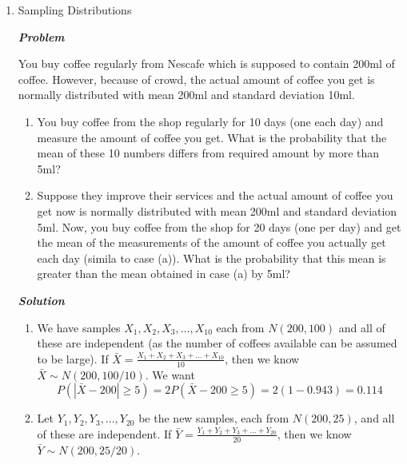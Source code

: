 \documentclass[12pt, oneside]{article}
\begin{document}
\begin{enumerate}
\begin{enumerate}
\end{enumerate}

\newpage

\item	Sampling Distributions

\textit{\textbf{Problem}}

You buy coffee regularly from Nescafe which is supposed to contain 200ml of coffee. However, because of crowd, the actual amount of coffee you get is normally distributed with mean 200ml and standard deviation 10ml. 

\begin{enumerate}
    \item You buy coffee from the shop regularly for 10 days (one each day) and measure the amount of coffee you get. What is the probability that the mean of these 10 numbers differs from required amount by more than 5ml?
    \item Suppose they improve their services and the actual amount of coffee you get now is normally distributed with mean 200ml and standard deviation 5ml. Now, you buy coffee from the shop for 20 days (one per day) and get the mean of the measurements of the amount of coffee you actually get each day (simila to case (a)). What is the probability that this mean is greater than the mean obtained in case (a) by 5ml?

\end{enumerate}

\textit{\textbf{Solution}}


\begin{enumerate}
    \item We have samples $X_1,X_2,X_3,\dots,X_{10}$ each from $N(200,100)$ and all of these are independent (as the number of coffees available can be assumed to be large). If $\bar X= \frac{X_1+X_2+X_3+\dots+X_10}{10}$, then we know $\bar X \sim N(200,100/10)$. We want
    \[ P(|\bar X - 200|\ge5)=2P(\bar X - 200\ge5) =  2(1-0.943)=0.114\]
    
    
    \item Let $Y_1,Y_2,Y_3,\dots,Y_{20}$ be the new samples, each from $N(200,25)$, and all of these are independent. If $\bar Y= \frac{Y_1+Y_2+Y_3+\dots+Y_20}{20}$, then we know $\bar Y \sim N(200,25/20)$. 
    

\end{enumerate}
\end{enumerate}
\end{document}
